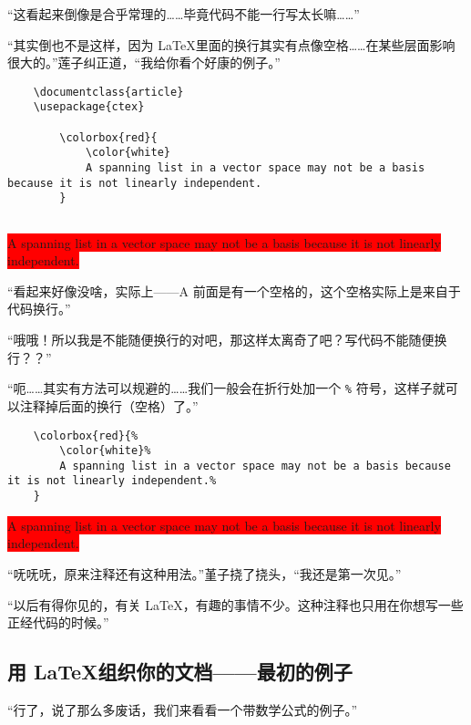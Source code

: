 “这看起来倒像是合乎常理的……毕竟代码不能一行写太长嘛……”

“其实倒也不是这样，因为 \LaTeX 里面的换行其实有点像空格……在某些层面影响很大的。”莲子纠正道，“我给你看个好康的例子。”

\begin{lstlisting}
    \documentclass{article}
    \usepackage{ctex}
    
        \colorbox{red}{
            \color{white} 
            A spanning list in a vector space may not be a basis because it is not linearly independent.
        }
    
\end{lstlisting}

\begin{center}\footnotesize
    \colorbox{red}{
        \color{white}
        A spanning list in a vector space may not be a basis because it is not linearly independent.
    }
\end{center}

“看起来好像没啥，实际上——A 前面是有一个空格的，这个空格实际上是来自于代码换行。”

“哦哦！所以我是不能随便换行的对吧，那这样太离奇了吧？写代码不能随便换行？？”

“呃……其实有方法可以规避的……我们一般会在折行处加一个 \verb"%" 符号，这样子就可以注释掉后面的换行（空格）了。”

\begin{lstlisting}
    \colorbox{red}{%
        \color{white}%
        A spanning list in a vector space may not be a basis because it is not linearly independent.%
    }
\end{lstlisting}

\begin{center}\footnotesize
    \colorbox{red}{%
        \color{white}%
        A spanning list in a vector space may not be a basis because it is not linearly independent.%
    }
\end{center}

“呒呒呒，原来注释还有这种用法。”堇子挠了挠头，“我还是第一次见。”

“以后有得你见的，有关 \LaTeX，有趣的事情不少。这种注释也只用在你想写一些正经代码的时候。”

\subsection{用 \LaTeX 组织你的文档——最初的例子}

“行了，说了那么多废话，我们来看看一个带数学公式的例子。”

